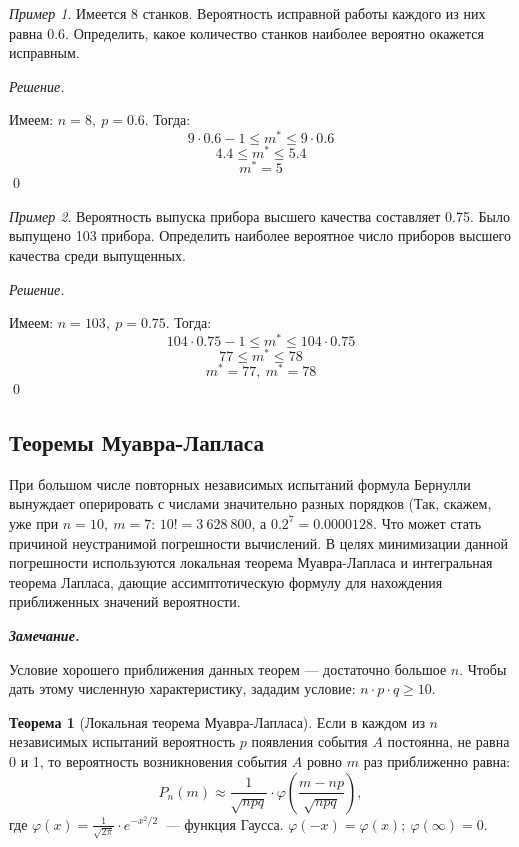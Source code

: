 \documentclass[12pt,a4paper]{article}
\theoremstyle{definition}
\theoremstyle{definition}
\newtheorem{theorem}{Теорема}[section]
\theoremstyle{remark}
\newenvironment{remark}{
  \par\noindent\textbf{\textit{Замечание.}}~
}{\par}
\theoremstyle{corollary}
\theoremstyle{bolditalic}
\newtheorem{example}{Пример}[section]
\newenvironment{solution}{
    \vspace{0.5em}
    \noindent\textit{Решение.}
}{\qed\vspace{1em}}
\begin{document}
\begin{example}
    Имеется 8 станков. Вероятность исправной работы каждого из них равна 0.6. Определить, какое количество станков наиболее вероятно окажется исправным.
\end{example}

\begin{solution}
    Имеем: $n=8,\ p=0.6$. Тогда:
    \[
    9\cdot 0.6-1 \le m^* \le 9\cdot 0.6
    \]
    \[
    4.4 \le m^* \le 5.4
    \]
    \[
    m^*=5
    \]
\end{solution}

\begin{example}
    Вероятность выпуска прибора высшего качества составляет 0.75. Было выпущено 103 прибора. Определить наиболее вероятное число приборов высшего качества среди выпущенных.
\end{example}

\begin{solution}
    Имеем: $n=103,\ p=0.75$. Тогда:
    \[
    104\cdot 0.75-1 \le m^* \le 104\cdot 0.75
    \]
    \[
    77 \le m^* \le 78
    \]
    \[
    m^*=77,\ m^*=78
    \]
\end{solution}

\subsection{Теоремы Муавра-Лапласа}

При большом числе повторных независимых испытаний формула Бернулли вынуждает оперировать с числами значительно разных порядков (Так, скажем, уже при $n=10,\ m=7$: $10!=3\ 628\ 800$, а $0.2^7=0.0000128$. Что может стать причиной неустранимой погрешности вычислений. В целях минимизации данной погрешности используются локальная теорема Муавра-Лапласа и интегральная теорема Лапласа, дающие ассимптотическую формулу для нахождения приближенных значений вероятности.
\\

\begin{remark}
    Условие хорошего приближения данных теорем --- достаточно большое $n$. Чтобы дать этому численную характеристику, зададим условие: $n\cdot p\cdot q \ge 10$.
\end{remark}

\begin{theorem}[Локальная теорема Муавра-Лапласа]
    Если в каждом из $n$ независимых испытаний вероятность $p$ появления события $A$ постоянна, не равна 0 и 1, то вероятность возникновения события $A$ ровно $m$ раз приближенно равна:
     \[
     P_n(m) \approx \frac{1}{\sqrt{npq}}\cdot \varphi\left(\frac{m-np}{\sqrt{npq}}\right), 
     \]
     где $\varphi(x)=\frac{1}{\sqrt{2\pi}}\cdot e^{-x^2/2}\ $ --- функция Гаусса. $\varphi(-x)=\varphi(x);\ \varphi(\infty)=0$.
\end{theorem}
\end{document}
